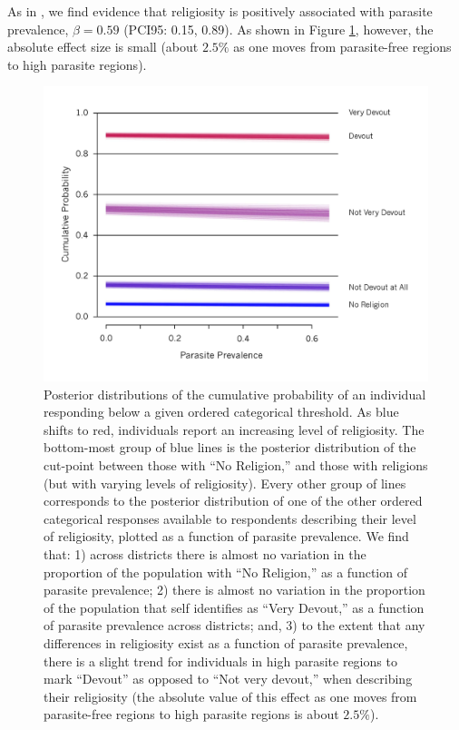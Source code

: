 \documentclass[12pt]{article}
\begin{document}
	As in \citet{Fincher2012}, we find evidence that religiosity is positively associated with parasite prevalence, $\beta=0.59$ (PCI95: 0.15, 0.89). As shown in Figure \ref{resRel}, however, the absolute effect size is small (about $2.5\%$ as one moves from parasite-free regions to high parasite regions).\\
 \begin{figure}
\caption{\label{resRel}  Posterior distributions of the cumulative probability of an individual responding below a given ordered categorical threshold. As blue shifts to red, individuals report an increasing level of religiosity. The bottom-most group of blue lines is the posterior distribution of the cut-point between those with ``No Religion,'' and those with religions (but with varying levels of religiosity). Every other group of lines corresponds to the posterior distribution of one of the other ordered categorical responses available to respondents describing their level of religiosity, plotted as a function of parasite prevalence. We find that:  1) across districts there is almost no variation in the proportion of the population with ``No Religion,'' as a function of parasite prevalence; 2) there is almost no variation in the proportion of the population that self identifies as ``Very Devout,'' as a function of parasite prevalence across districts; and, 3) to the extent that any differences in religiosity exist as a function of parasite prevalence, there is a slight trend for individuals in high parasite regions to mark ``Devout'' as opposed to ``Not very devout,'' when describing their religiosity (the absolute value of this effect as one moves from parasite-free regions to high parasite regions is about $2.5\%$). }
\includegraphics[width=5in]{Figures/ReligiosityModel} 
\end{figure}
\end{document}
